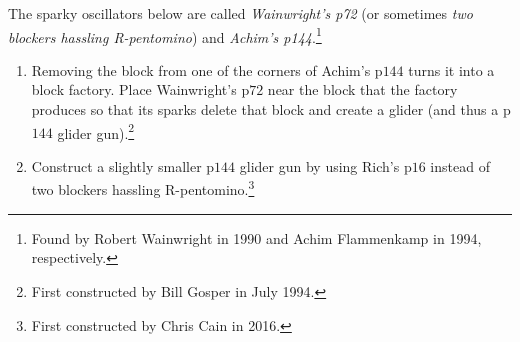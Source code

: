\begin{multicols}{2}
	
	\begin{problem}\label{exer:p144_gun_from_achim}
		The sparky oscillators below are called \emph{Wainwright's p72} (or sometimes \emph{two blockers hassling R-pentomino}) and \emph{Achim's p144}.\footnote{Found by Robert Wainwright in 1990 and Achim Flammenkamp in 1994, respectively.}
		\begin{center}
			 \quad {}
		\end{center}
		
		\begin{enumerate}[label=\bf\color{ocre}(\alph*)]
			\item Removing the block from one of the corners of Achim's p$144$ turns it into a block factory. Place Wainwright's p$72$ near the block that the factory produces so that its sparks delete that block and create a glider (and thus a p$144$ glider gun).\footnote{First constructed by Bill Gosper in July 1994.}
			
			\item Construct a slightly smaller p$144$ glider gun by using Rich's p$16$ instead of two blockers hassling R-pentomino.\footnote{First constructed by Chris Cain in 2016.}
		\end{enumerate}
	\end{problem}
	
	

\end{multicols}
